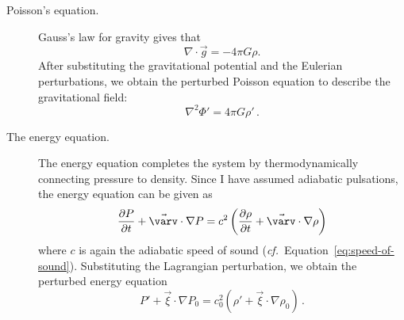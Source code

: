 \begin{description}
    \item[Poisson's equation.] %
    Gauss's law for gravity gives that
    \begin{equation}
        \nabla \cdot \vec g
        =
        -4\pi G \rho.
    \end{equation}
    After substituting the gravitational potential and the Eulerian perturbations, we obtain the perturbed Poisson equation to describe the gravitational field: 
    \begin{equation} \label{eq:perturbed-poisson} \boxed{
        \nabla^2 \Phi'
        =
        4\pi G \rho'
    }\,.\end{equation}
    
    \item[The energy equation.]
    The energy equation completes the system by thermodynamically connecting pressure to density. 
    Since I have assumed adiabatic pulsations, the energy equation can be given as
    \begin{equation} %
        \frac{\partial P}{\partial t}
        +
        \vec{\varv}
        \cdot
        \nabla P
        =
        c^2 
        \left(
            \frac{\partial \rho}{\partial t}
            +
            \vec{\varv} \cdot \nabla \rho
        \right)
    \end{equation}
    where $c$ is again the adiabatic speed of sound (\emph{cf.}~Equation~\ref{eq:speed-of-sound}). 
    Substituting the Lagrangian perturbation, we obtain the perturbed energy equation
    \begin{equation} \label{eq:perturbed-energy} \boxed{
        P'
        +
        \vec \xi \cdot \nabla P_0
        =
        c^2_0 \left( 
            \rho' + \vec \xi \cdot \nabla \rho_0
        \right)
    }\,.\end{equation}
\end{description}


